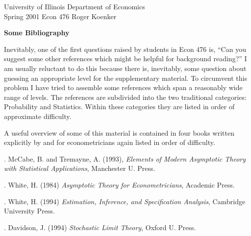 
\setlength{\textwidth}{170mm}
\setlength{\textheight}{220mm}
\setlength{\oddsidemargin}{0mm}
\setlength{\evensidemargin}{10mm}
\setlength{\topmargin}{-10mm}
\def\RR{\hbox{\raise.4ex\hbox{$\scriptstyle{|}$}\hskip-1.85pt R}}
\newcommand{\REF}{\nopagebreak\noindent{\large{\bf
      References}}\vspace{.2in}}

\newcommand{\Ref}[1]{\medskip\noindent\hangafter=1
      \hangindent=20pt\ignorespaces #1}
\pagestyle{empty}



\noindent
University of Illinois \hfill Department of Economics \\
Spring 2001 \hfill Econ 476 \hfill Roger Koenker

\vspace{4mm}
\begin{center}

\large{
{\bf Some Bibliography }}
\end{center}

\vspace{10mm}
Inevitably, one of the first questions raised by students in Econ 476 is, ``Can you suggest some other references which might be helpful for 
background reading?''  I am usually reluctant to do this because there is, 
inevitably, some question about guessing an appropriate level for the 
supplementary material.  To circumvent this problem I have tried to 
assemble some references which span a reasonably wide range of levels.  The
references are subdivided into the two traditional categories:  Probability 
and Statistics.  Within these categories they are listed in order of 
approximate difficulty.

A useful overview of some of this material is contained in four books
written explicitly by and for econometricians again listed in order of
difficulty.

\vspace{2mm}
\Ref 1.   McCabe, B. and Tremayne, A. (1993), {\it Elements of Modern
Asymptotic Theory with Statistical Applications}, Manchester U. Press.

\Ref 2.  White, H. (1984) {\it Asymptotic Theory for Econometricians},
Academic Press.

\Ref 3. White, H. (1994) 
{\it Estimation, Inference, and Specification Analysis}, 
Cambridge University Press.

\Ref 4.  Davidson, J. (1994) {\it Stochastic Limit Theory}, Oxford U. Press.

